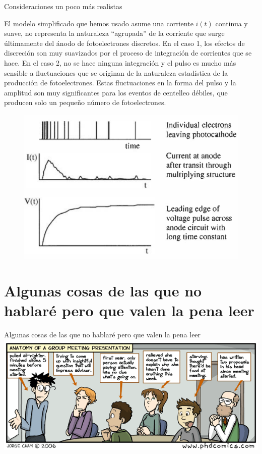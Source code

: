 \documentclass[a4paper,10pt]{beamer}
\begin{document}
\begin{frame}{Consideraciones un poco más realistas}

\begin{justify}
\small
El modelo simplificado que hemos usado asume una corriente $i(t)$ continua y suave, 
no representa la naturaleza ``agrupada'' de la corriente que surge últimamente 
del ánodo de fotoelectrones discretos. En el caso 1, los efectos de discreción 
son muy suavizados por el proceso de integración de corrientes que se hace. En el 
caso 2, no se hace ninguna integración y el pulso es mucho más sensible a fluctuaciones 
que se originan de la naturaleza estadística de la producción de fotoelectrones. Estas 
fluctuaciones en la forma del pulso y la amplitud son muy significantes para los eventos 
de centelleo débiles, que producen solo un pequeño número de fotoelectrones.
\end{justify}

\begin{figure}
 \center
 \includegraphics[scale=0.38]{fig47}
\end{figure}
\end{frame}

\section{Algunas cosas de las que no hablaré pero que valen la pena leer}

\begin{frame}
\begin{center}
 {\huge{\color{blue}Algunas cosas de las que no hablaré pero que valen la pena leer}} \\
 \vspace{0.5cm}
 \includegraphics[scale=0.54]{fig48}
\end{center}
\end{frame}
\end{document}
